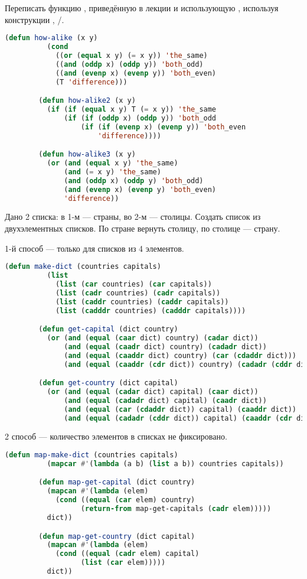 \documentclass[a4paper,oneside,12pt]{extreport}
\begin{document}


\begin{task}
	Переписать функцию , приведённую в лекции и использующую , используя конструкции , /.

	\begin{lstlisting}[language=Lisp, gobble=16]
		(defun how-alike (x y)
		  (cond
		    ((or (equal x y) (= x y)) 'the_same)
		    ((and (oddp x) (oddp y)) 'both_odd)
		    ((and (evenp x) (evenp y)) 'both_even)
		    (T 'difference)))

		(defun how-alike2 (x y)
		  (if (if (equal x y) T (= x y)) 'the_same
		      (if (if (oddp x) (oddp y)) 'both_odd
		          (if (if (evenp x) (evenp y)) 'both_even
		              'difference))))

		(defun how-alike3 (x y)
		  (or (and (equal x y) 'the_same)
		      (and (= x y) 'the_same)
		      (and (oddp x) (oddp y) 'both_odd)
		      (and (evenp x) (evenp y) 'both_even)
		      'difference))
	\end{lstlisting}
\end{task}

\begin{task}
	Дано 2 списка: в 1-м — страны, во 2-м — столицы.
	Создать список из двухэлементных списков.
	По стране вернуть столицу, по столице — страну.

	1-й способ — только для списков из 4 элементов.
	\begin{lstlisting}[language=Lisp, gobble=16]
		(defun make-dict (countries capitals)
		  (list
		    (list (car countries) (car capitals))
		    (list (cadr countries) (cadr capitals))
		    (list (caddr countries) (caddr capitals))
		    (list (cadddr countries) (cadddr capitals))))

		(defun get-capital (dict country)
		  (or (and (equal (caar dict) country) (cadar dict))
		      (and (equal (caadr dict) country) (cadadr dict))
		      (and (equal (caaddr dict) country) (car (cdaddr dict)))
		      (and (equal (caaddr (cdr dict)) country) (cadadr (cddr dict)))))

		(defun get-country (dict capital)
		  (or (and (equal (cadar dict) capital) (caar dict))
		      (and (equal (cadadr dict) capital) (caadr dict))
		      (and (equal (car (cdaddr dict)) capital) (caaddr dict))
		      (and (equal (cadadr (cddr dict)) capital) (caaddr (cdr dict)))))
	\end{lstlisting}

	2 способ — количество элементов в списках не фиксировано.
	\begin{lstlisting}[language=Lisp, gobble=16]
		(defun map-make-dict (countries capitals)
		  (mapcar #'(lambda (a b) (list a b)) countries capitals))

		(defun map-get-capital (dict country)
		  (mapcan #'(lambda (elem)
		    (cond ((equal (car elem) country)
		          (return-from map-get-capitals (cadr elem)))))
		  dict))

		(defun map-get-country (dict capital)
		  (mapcan #'(lambda (elem)
		    (cond ((equal (cadr elem) capital)
		          (list (car elem)))))
		  dict))
	\end{lstlisting}
\end{task}
\end{document}
